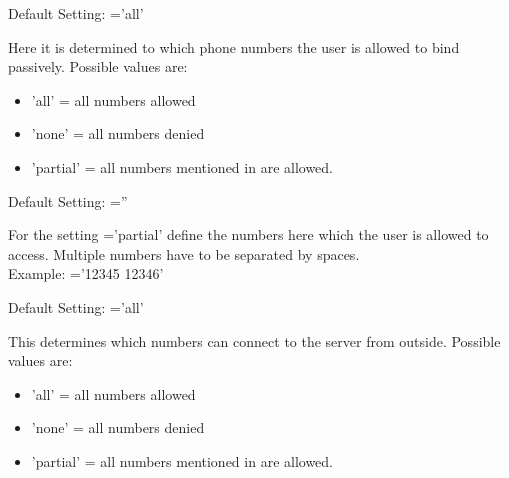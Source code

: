 \begin{description}

        Default Setting: ='all'

        Here it is determined to which phone numbers the user is allowed to bind passively.
        Possible values are:
        \begin{itemize}
            \item 'all' = all numbers allowed
            \item 'none' = all numbers denied
            \item 'partial' = all numbers mentioned in
                are allowed.
        \end{itemize}


        Default Setting: =''

        For the setting ='partial' define the numbers
        here which the user is allowed to access.
        Multiple numbers have to be separated by spaces. \\
        Example: ='12345 12346'


        Default Setting: ='all'

        This determines which numbers can connect to the server from outside.
        Possible values are:
        \begin{itemize}
           \item 'all' = all numbers allowed
            \item 'none' = all numbers denied
            \item 'partial' = all numbers mentioned in
                are allowed.
        \end{itemize}



\end{description}

